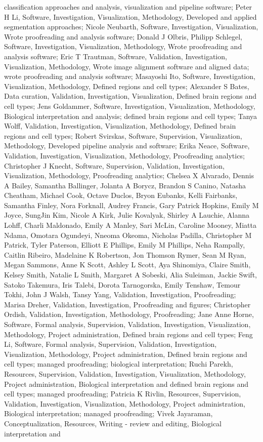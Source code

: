\documentclass{article}
\begin{document}
classification approaches and analysis, visualization and pipeline software; Peter H Li, Software, Investigation, Visualization, Methodology, Developed and applied segmentation approaches; Nicole Neubarth, Software, Investigation, Visualization, Wrote proofreading and analysis software; Donald J Olbris, Philipp Schlegel, Software, Investigation, Visualization, Methodology, Wrote proofreading and analysis software; Eric T Trautman, Software, Validation, Investigation, Visualization, Methodology, Wrote image alignment software and aligned data; wrote proofreading and analysis software; Masayoshi Ito, Software, Investigation, Visualization, Methodology, Defined regions and cell types; Alexander S Bates, Data curation, Validation, Investigation, Visualization, Defined brain regions and cell types; Jens Goldammer, Software, Investigation, Visualization, Methodology, Biological interpretation and analysis; defined brain regions and cell types; Tanya Wolff, Validation, Investigation, Visualization, Methodology, Defined brain regions and cell types; Robert Svirskas, Software, Supervision, Visualization, Methodology, Developed pipeline analysis and software; Erika Neace, Software, Validation, Investigation, Visualization, Methodology, Proofreading analytics; Christopher J Knecht, Software, Supervision, Validation, Investigation, Visualization, Methodology, Proofreading analytics; Chelsea X Alvarado, Dennis A Bailey, Samantha Ballinger, Jolanta A Borycz, Brandon S Canino, Natasha Cheatham, Michael Cook, Octave Duclos, Bryon Eubanks, Kelli Fairbanks, Samantha Finley, Nora Forknall, Audrey Francis, Gary Patrick Hopkins, Emily M Joyce, SungJin Kim, Nicole A Kirk, Julie Kovalyak, Shirley A Lauchie, Alanna Lohff, Charli Maldonado, Emily A Manley, Sari McLin, Caroline Mooney, Miatta Ndama, Omotara Ogundeyi, Nneoma Okeoma, Nicholas Padilla, Christopher M Patrick, Tyler Paterson, Elliott E Phillips, Emily M Phillips, Neha Rampally, Caitlin Ribeiro, Madelaine K Robertson, Jon Thomson Rymer, Sean M Ryan, Megan Sammons, Anne K Scott, Ashley L Scott, Aya Shinomiya, Claire Smith, Kelsey Smith, Natalie L Smith, Margaret A Sobeski, Alia Suleiman, Jackie Swift, Satoko Takemura, Iris Talebi, Dorota Tarnogorska, Emily Tenshaw, Temour Tokhi, John J Walsh, Tansy Yang, Validation, Investigation, Proofreading; Marisa Dreher, Validation, Investigation, Proofreading and figures; Christopher Ordish, Validation, Investigation, Methodology, Proofreading; Jane Anne Horne, Software, Formal analysis, Supervision, Validation, Investigation, Visualization, Methodology, Project administration, Defined brain regions and cell types; Feng Li, Software, Formal analysis, Supervision, Validation, Investigation, Visualization, Methodology, Project administration, Defined brain regions and cell types; managed proofreading; biological interpretation; Ruchi Parekh, Resources, Supervision, Validation, Investigation, Visualization, Methodology, Project administration, Biological interpretation and defined brain regions and cell types; managed proofreading; Patricia K Rivlin, Resources, Supervision, Validation, Investigation, Visualization, Methodology, Project administration, Biological interpretation; managed proofreading; Vivek Jayaraman, Conceptualization, Resources, Writing - review and editing, Biological interpretation and 
\end{document}
